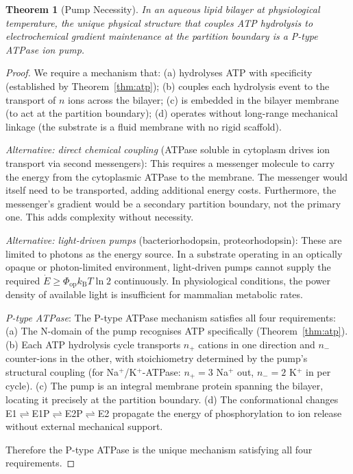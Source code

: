 \documentclass[11pt,twocolumn,a4paper]{article}
\newtheorem{theorem}{Theorem}[section]
\theoremstyle{definition}
\theoremstyle{remark}
\newcommand{\kB}{k_{\mathrm{B}}}
\begin{document}
\begin{theorem}[Pump Necessity]
\label{thm:pump}
In an aqueous lipid bilayer at physiological temperature, the unique physical
structure that couples ATP hydrolysis to electrochemical gradient maintenance
at the partition boundary is a P-type ATPase ion pump.
\end{theorem}

\begin{proof}
We require a mechanism that: (a) hydrolyses ATP with specificity (established
by Theorem~\ref{thm:atp}); (b) couples each hydrolysis event to the transport
of $n$ ions across the bilayer; (c) is embedded in the bilayer membrane (to
act at the partition boundary); (d) operates without long-range mechanical
linkage (the substrate is a fluid membrane with no rigid scaffold).

\textit{Alternative: direct chemical coupling} (ATPase soluble in cytoplasm
drives ion transport via second messengers): This requires a messenger molecule
to carry the energy from the cytoplasmic ATPase to the membrane. The messenger
would itself need to be transported, adding additional energy costs. Furthermore,
the messenger's gradient would be a secondary partition boundary, not the primary
one. This adds complexity without necessity.

\textit{Alternative: light-driven pumps} (bacteriorhodopsin, proteorhodopsin):
These are limited to photons as the energy source. In a substrate operating in
an optically opaque or photon-limited environment, light-driven pumps cannot
supply the required $\dot{E} \geq \Phi_{\mathrm{op}} \kB T \ln 2$ continuously.
In physiological conditions, the power density of available light is insufficient
for mammalian metabolic rates.

\textit{P-type ATPase}: The P-type ATPase mechanism \citep{pedersen2010} satisfies
all four requirements:
(a) The N-domain of the pump recognises ATP specifically (Theorem~\ref{thm:atp}).
(b) Each ATP hydrolysis cycle transports $n_+$ cations in one direction and
$n_-$ counter-ions in the other, with stoichiometry determined by the pump's
structural coupling (for Na$^+$/K$^+$-ATPase: $n_+ = 3$ Na$^+$ out, $n_- = 2$
K$^+$ in per cycle).
(c) The pump is an integral membrane protein spanning the bilayer, locating it
precisely at the partition boundary.
(d) The conformational changes E1$\rightleftharpoons$E1P$\rightleftharpoons$E2P$\rightleftharpoons$E2
\citep{albers1967, post1969} propagate the energy of phosphorylation to ion
release without external mechanical support.

Therefore the P-type ATPase is the unique mechanism satisfying all four requirements.
\end{proof}
\end{document}
